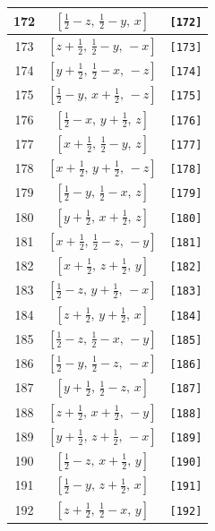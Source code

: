 \documentclass[fleqn,8pt]{jsarticle}
\begin{document}
\begin{longtable}{ccc}
172 & $\left[ \frac{1}{2} - z,\, \frac{1}{2} - y,\, x \right]$ & {\tt [172]} \\ \hline
173 & $\left[ z + \frac{1}{2},\, \frac{1}{2} - y,\, - x \right]$ & {\tt [173]} \\ \hline
174 & $\left[ y + \frac{1}{2},\, \frac{1}{2} - x,\, - z \right]$ & {\tt [174]} \\ \hline
175 & $\left[ \frac{1}{2} - y,\, x + \frac{1}{2},\, - z \right]$ & {\tt [175]} \\ \hline
176 & $\left[ \frac{1}{2} - x,\, y + \frac{1}{2},\, z \right]$ & {\tt [176]} \\ \hline
177 & $\left[ x + \frac{1}{2},\, \frac{1}{2} - y,\, z \right]$ & {\tt [177]} \\ \hline
178 & $\left[ x + \frac{1}{2},\, y + \frac{1}{2},\, - z \right]$ & {\tt [178]} \\ \hline
179 & $\left[ \frac{1}{2} - y,\, \frac{1}{2} - x,\, z \right]$ & {\tt [179]} \\ \hline
180 & $\left[ y + \frac{1}{2},\, x + \frac{1}{2},\, z \right]$ & {\tt [180]} \\ \hline
181 & $\left[ x + \frac{1}{2},\, \frac{1}{2} - z,\, - y \right]$ & {\tt [181]} \\ \hline
182 & $\left[ x + \frac{1}{2},\, z + \frac{1}{2},\, y \right]$ & {\tt [182]} \\ \hline
183 & $\left[ \frac{1}{2} - z,\, y + \frac{1}{2},\, - x \right]$ & {\tt [183]} \\ \hline
184 & $\left[ z + \frac{1}{2},\, y + \frac{1}{2},\, x \right]$ & {\tt [184]} \\ \hline
185 & $\left[ \frac{1}{2} - z,\, \frac{1}{2} - x,\, - y \right]$ & {\tt [185]} \\ \hline
186 & $\left[ \frac{1}{2} - y,\, \frac{1}{2} - z,\, - x \right]$ & {\tt [186]} \\ \hline
187 & $\left[ y + \frac{1}{2},\, \frac{1}{2} - z,\, x \right]$ & {\tt [187]} \\ \hline
188 & $\left[ z + \frac{1}{2},\, x + \frac{1}{2},\, - y \right]$ & {\tt [188]} \\ \hline
189 & $\left[ y + \frac{1}{2},\, z + \frac{1}{2},\, - x \right]$ & {\tt [189]} \\ \hline
190 & $\left[ \frac{1}{2} - z,\, x + \frac{1}{2},\, y \right]$ & {\tt [190]} \\ \hline
191 & $\left[ \frac{1}{2} - y,\, z + \frac{1}{2},\, x \right]$ & {\tt [191]} \\ \hline
192 & $\left[ z + \frac{1}{2},\, \frac{1}{2} - x,\, y \right]$ & {\tt [192]} \\
\end{longtable}
\end{document}
